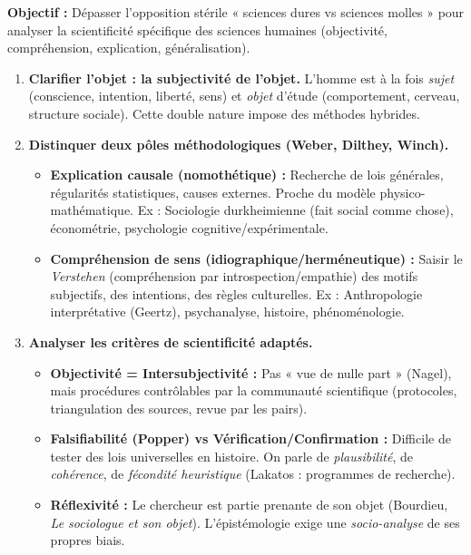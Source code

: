 \documentclass[11pt]{article}
\newcommand{\cle}[1]{{\popxbold\color{popdark}#1}}
\begin{document}
\begin{methode}
    \textbf{Objectif :} Dépasser l'opposition stérile « sciences dures vs sciences molles » pour analyser la scientificité spécifique des sciences humaines (objectivité, compréhension, explication, généralisation).
    \begin{enumerate}
        \item \textbf{Clarifier l'objet : la \cle{subjectivité de l'objet}.} L'homme est à la fois \emph{sujet} (conscience, intention, liberté, sens) et \emph{objet} d'étude (comportement, cerveau, structure sociale). Cette double nature impose des méthodes hybrides.
        \item \textbf{Distinquer deux pôles méthodologiques (Weber, Dilthey, Winch).}
        \begin{itemize}
            \item \textbf{Explication causale (nomothétique) :} Recherche de lois générales, régularités statistiques, causes externes. Proche du modèle physico-mathématique. Ex : Sociologie durkheimienne (fait social comme chose), économétrie, psychologie cognitive/expérimentale.
            \item \textbf{Compréhension de sens (idiographique/herméneutique) :} Saisir le \emph{Verstehen} (compréhension par introspection/empathie) des motifs subjectifs, des intentions, des règles culturelles. Ex : Anthropologie interprétative (Geertz), psychanalyse, histoire, phénoménologie.
        \end{itemize}
        \item \textbf{Analyser les critères de scientificité adaptés.}
        \begin{itemize}
            \item \textbf{Objectivité = Intersubjectivité :} Pas « vue de nulle part » (Nagel), mais procédures contrôlables par la communauté scientifique (protocoles, triangulation des sources, revue par les pairs).
            \item \textbf{Falsifiabilité (Popper) vs Vérification/Confirmation :} Difficile de tester des lois universelles en histoire. On parle de \emph{plausibilité}, de \emph{cohérence}, de \emph{fécondité heuristique} (Lakatos : programmes de recherche).
            \item \textbf{Réflexivité :} Le chercheur est partie prenante de son objet (Bourdieu, \emph{Le sociologue et son objet}). L'épistémologie exige une \emph{socio-analyse} de ses propres biais.

\end{itemize}
\end{enumerate}
\end{methode}
\end{document}
